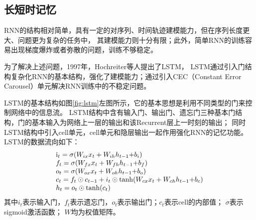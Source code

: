 \subsection{长短时记忆}

RNN的结构相对简单，具有一定的对序列、时间轨迹建模能力，但在序列长度更大、问题更为复杂的任务中，
其建模能力则十分有限；此外，简单RNN的训练容易出现梯度爆炸或者弥散的问题，训练不够稳定。

为了解决上述问题，1997年，Hochreiter等人提出了LSTM，
LSTM通过引入门结构复杂化RNN的基本结构，强化了建模能力；通过引入CEC（Constant Error Carousel）单元解决RNN训练中的不稳定问题。


LSTM的基本结构如图\ref{fig:lstm}左图所示，它的基本思想是利用不同类型的门来控制网络中的信息流。
LSTM结构中含有输入门、输出门、遗忘门三种基本门结构，门的基本输入为网络上一层的输出和该Recurrent层上一时刻的输出；
同时LSTM结构中引入cell单元，cell单元和隐层输出一起作用强化RNN的记忆功能。
LSTM的数据流向如下：
\begin{equation}
\begin{array}{l}
{{\rm{i}}_t} = \sigma ({W_{ix}}{x_t} + {W_{ih}}{h_{t - 1}}{\rm{ + }}{b_i})\\
{f_t} = \sigma ({W_{fx}}{x_t} + {W_{fh}}{h_{t - 1}}{\rm{ + }}{b_f})\\
{o_t} = \sigma ({W_{ox}}{x_t} + {W_{oh}}{h_{t - 1}}{\rm{ + }}{b_o})\\
{c_t} = {f_t} \odot {c_{t - 1}} + {i_t} \odot \tanh ({W_{cx}}{x_t} + {W_{ch}}{h_{t - 1}}{\rm{ + }}{b_c})\\
{h_t} = {o_t} \odot \tanh ({c_t})
\end{array}
\end{equation}
其中$i_t$表示输入门，$f_t$表示遗忘门，$o_t$表示输出门；$c_t$表示cell的内部值；
$\sigma$表示sigmoid激活函数；
$W$均为权值矩阵。

